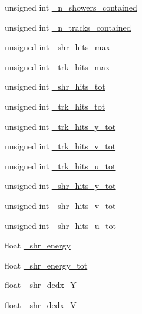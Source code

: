\begin{DoxyCompactItemize}
\item 
unsigned int \hyperlink{classselection_1_1NuMuSelection_a8583770de84e76b78e7ddfb4b7e733da}{\-\_\-n\-\_\-showers\-\_\-contained}
\item 
unsigned int \hyperlink{classselection_1_1NuMuSelection_a4f7501393a59de50a8547b6ff2f286b8}{\-\_\-n\-\_\-tracks\-\_\-contained}
\item 
unsigned int \hyperlink{classselection_1_1NuMuSelection_ab314b2264e547d258e88d2f773352b9f}{\-\_\-shr\-\_\-hits\-\_\-max}
\item 
unsigned int \hyperlink{classselection_1_1NuMuSelection_a3e0166490638c0d08a3b66de9ed1ec91}{\-\_\-trk\-\_\-hits\-\_\-max}
\item 
unsigned int \hyperlink{classselection_1_1NuMuSelection_a9233cd2b1aa05f66da7c04f99ff99058}{\-\_\-shr\-\_\-hits\-\_\-tot}
\item 
unsigned int \hyperlink{classselection_1_1NuMuSelection_abcc3673c89468d4af37e7936ac5716ea}{\-\_\-trk\-\_\-hits\-\_\-tot}
\item 
unsigned int \hyperlink{classselection_1_1NuMuSelection_a7c0ae4ea16390adf8803846578ad2d05}{\-\_\-trk\-\_\-hits\-\_\-y\-\_\-tot}
\item 
unsigned int \hyperlink{classselection_1_1NuMuSelection_adf551288be333a585b4fe8b111b8d3dc}{\-\_\-trk\-\_\-hits\-\_\-v\-\_\-tot}
\item 
unsigned int \hyperlink{classselection_1_1NuMuSelection_ab9a14b2e6823b5309c44d17e343087c6}{\-\_\-trk\-\_\-hits\-\_\-u\-\_\-tot}
\item 
unsigned int \hyperlink{classselection_1_1NuMuSelection_a2d08099d9037a3bc8b3b5c7de3de4b4f}{\-\_\-shr\-\_\-hits\-\_\-y\-\_\-tot}
\item 
unsigned int \hyperlink{classselection_1_1NuMuSelection_aa2d62d528b55bfbb0964fa68f2d0ff04}{\-\_\-shr\-\_\-hits\-\_\-v\-\_\-tot}
\item 
unsigned int \hyperlink{classselection_1_1NuMuSelection_aa88c0578a68ec301fecbe3262aa44762}{\-\_\-shr\-\_\-hits\-\_\-u\-\_\-tot}
\item 
float \hyperlink{classselection_1_1NuMuSelection_a06ebfacd01494668815b794a793e58cf}{\-\_\-shr\-\_\-energy}
\item 
float \hyperlink{classselection_1_1NuMuSelection_a73da6cca89a0a1a854297f4d0a2ac851}{\-\_\-shr\-\_\-energy\-\_\-tot}
\item 
float \hyperlink{classselection_1_1NuMuSelection_a94dda0e5c78c02e5787f00ded787f7ab}{\-\_\-shr\-\_\-dedx\-\_\-\-Y}
\item 
float \hyperlink{classselection_1_1NuMuSelection_a779a5d2a981609620e58ecb9cc476757}{\-\_\-shr\-\_\-dedx\-\_\-\-V}

\end{DoxyCompactItemize}
